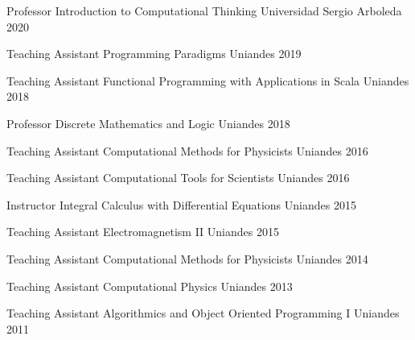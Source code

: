 


\begin{cvhonors}

    \cvhonor
    {Professor}
    {Introduction to Computational Thinking}
    {Universidad Sergio Arboleda}
    {2020}

    \cvhonor
    {Teaching Assistant}
    {Programming Paradigms}
    {Uniandes}
    {2019}

    \cvhonor
    {Teaching Assistant}
    {Functional Programming with Applications in Scala}
    {Uniandes}
    {2018}

    \cvhonor
    {Professor}
    {Discrete Mathematics and Logic}
    {Uniandes}
    {2018}

    \cvhonor
    {Teaching Assistant} %
    {Computational Methods for Physicists} %
    {Uniandes} %
    {2016} %

    \cvhonor
    {Teaching Assistant} %
    {Computational Tools for Scientists} %
    {Uniandes} %
    {2016} %

    \cvhonor
    {Instructor} %
    {Integral Calculus with Differential Equations} %
    {Uniandes} %
    {2015} %

    \cvhonor
    {Teaching Assistant} %
    {Electromagnetism II} %
    {Uniandes} %
    {2015} %

    \cvhonor
    {Teaching Assistant} %
    {Computational Methods for Physicists} %
    {Uniandes} %
    {2014} %

    \cvhonor
    {Teaching Assistant} %
    {Computational Physics} %
    {Uniandes} %
    {2013} %

    \cvhonor
    {Teaching Assistant} %
    {Algorithmics and Object Oriented Programming I} %
    {Uniandes} %
    {2011} %

\end{cvhonors}
